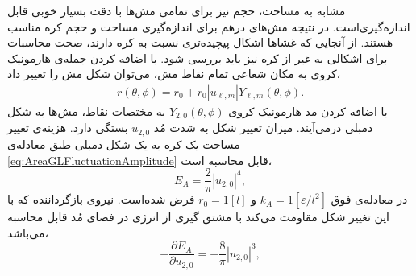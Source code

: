 مشابه به مساحت، حجم نیز برای تمامی مش‌ها با دقت بسیار خوبی قابل اندازه‌گیری‌است. در نتیجه مش‌های درهم برای اندازه‌گیری مساحت و حجم کره مناسب هستند. از آنجایی که غشا‌ها اشکال پیچیده‌تری نسبت به کره دارند، صحت محاسبات برای اشکالی به غیر از کره نیز باید بررسی شود. با اضافه کردن جمله‌ی هارمونیک کروی به مکان شعاعی تمام نقاط مش، می‌توان شکل مش را تغییر داد،
\begin{eqnarray}
r(\theta,\phi)=r_0+r_0|u_{\ell,m}|Y_{\ell,m}(\theta,\phi).
\label{eq:rDeformed}
\end{eqnarray}
با اضافه کردن مد هارمونیک کروی
$Y_{2,0}(\theta,\phi)$
به مختصات نقاط، مش‌ها به شکل دمبلی درمی‌آیند. میزان تغییر شکل به شدت مُد
$u_{2,0}$
بستگی دارد. هزینه‌ی تغییر مساحت یک کره به یک شکل دمبلی طبق معادله‌ی
\ref{eq:AreaGLFluctuationAmplitude}
قابل محاسبه ‌است،
\begin{equation}
E_A=\frac{2}{\pi}|u_{2,0}|^4,
\label{eq:AreaEnergyULM20}
\end{equation}
در معادله‌ی فوق 
$k_A=1[\varepsilon/l^2]$
و
$r_0=1[l]$
فرض شده‌است. نیروی بازگرداننده که با این تغییر شکل مقاومت می‌کند با مشتق گیری از انرژی در فضای مُد قابل محاسبه‌ می‌باشد، 
\begin{equation}
-\frac{\partial E_A}{\partial u_{2,0}}=-\frac{8}{\pi}|u_{2,0}|^3,
\label{eq:AreaForceULM20}
\end{equation}


